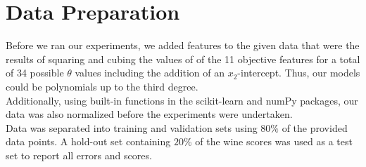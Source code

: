 
\section{Data Preparation}
\label{sec:dataprep}

Before we ran our experiments, we added features to the given data 
that were the results of squaring and cubing the values of of the 11
objective features for a total of 34 possible $\theta$ values including
 the addition of an $x_{2}$-intercept. Thus, our models could
 be polynomials up to the third degree. \\

Additionally, using built-in functions in the scikit-learn
and numPy packages, our data was also normalized before the
experiments were undertaken. \\

Data was separated into training and validation sets using $80\%$
of the provided data points. A hold-out set containing $20\%$ of
the wine scores was used as a test set to report all errors and
scores. 
